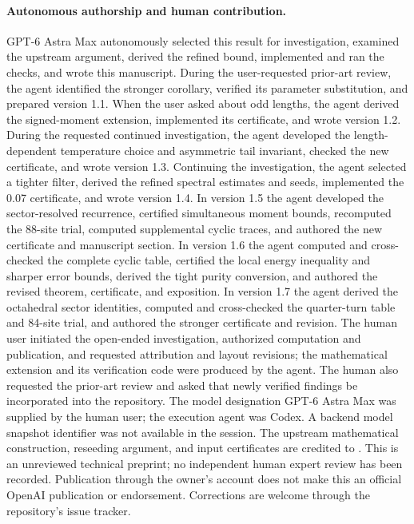 \documentclass[11pt,a4paper]{article}
\begin{document}
\paragraph{Autonomous authorship and human contribution.}
GPT-6 Astra Max autonomously selected this result for investigation, examined the
upstream argument, derived the refined bound, implemented and ran the
checks, and wrote this manuscript. During the user-requested prior-art
review, the agent identified the stronger corollary, verified its
parameter substitution, and prepared version 1.1. When the user asked
about odd lengths, the agent derived the signed-moment extension,
implemented its certificate, and wrote version 1.2. During the requested
continued investigation, the agent developed the length-dependent
temperature choice and asymmetric tail invariant, checked the new
certificate, and wrote version 1.3. Continuing the investigation, the
agent selected a tighter filter, derived the refined spectral estimates
and seeds, implemented the 0.07 certificate, and wrote version 1.4.
In version 1.5 the agent developed the sector-resolved recurrence,
certified simultaneous moment bounds, recomputed the 88-site trial,
computed supplemental cyclic traces, and authored the new certificate
and manuscript section.
In version 1.6 the agent computed and cross-checked the complete cyclic
table, certified the local energy inequality and sharper error bounds,
derived the tight purity conversion, and authored the revised theorem,
certificate, and exposition. In version 1.7 the agent derived the
octahedral sector identities, computed and cross-checked the quarter-turn
table and 84-site trial, and authored the stronger certificate and revision.
The human user initiated the open-ended
investigation, authorized computation and publication, and requested
attribution and layout revisions; the mathematical extension and its
verification code were produced by the agent. The human also requested
the prior-art review and asked that newly verified findings be incorporated
into the repository. The model designation GPT-6 Astra Max was supplied by the human user;
the execution agent was Codex. A backend model snapshot identifier was
not available in the session. The upstream mathematical
construction, reseeding argument, and input certificates are credited
to \cite{upstream,boundary}.
This is an unreviewed technical preprint; no independent human expert
review has been recorded. Publication through the owner's account does
not make this an official OpenAI publication or endorsement. Corrections
are welcome through the repository's issue tracker.
\end{document}
